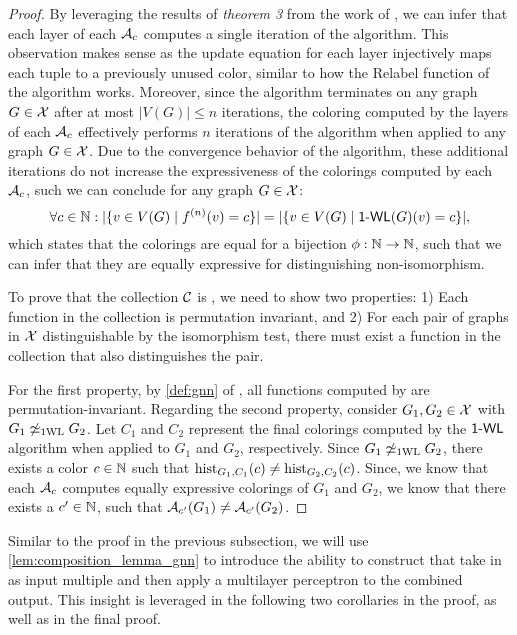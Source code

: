 \begin{proof}
    By leveraging the results of \textit{theorem 3} from the work of \cite{Xu2018}, we can infer that each layer of each $\mathcal{A}_c$ computes a single iteration of the \wl algorithm. This observation makes sense as the update equation for each layer injectively maps each tuple to a previously unused color, similar to how the \textsf{Relabel} function of the \wl algorithm works. Moreover, since the \wl algorithm terminates on any graph $G \in \mathcal{X}$ after at most $|V(G)| \leq n$ iterations, the coloring computed by the layers of each $\mathcal{A}_c$ effectively performs $n$ iterations of the \wl algorithm when applied to any graph $G \in \mathcal{X}$. Due to the convergence behavior of the \wl algorithm, these additional iterations do not increase the expressiveness of the colorings computed by each $\mathcal{A}_c$, such we can conclude for any graph $G \in \mathcal{X}$:
    \begin{equation*}
       \forall c \in \mathbb{N}: |\{ v \in V(G) \mid  f^{(n)}(v) = c \}| = |\{ v \in V(G) \mid  \textsf{1-WL}(G)(v) = c \}|,
    \end{equation*}
    which states that the colorings are equal for a bijection $\phi : \mathbb{N} \rightarrow \mathbb{N}$, such that we can infer that they are equally expressive for distinguishing non-isomorphism.

    To prove that the collection $\mathcal{C}$ is \wldisc, we need to show two properties: 1) Each function in the collection is permutation invariant, and 2) For each pair of graphs in $\mathcal{X}$ distinguishable by the \wl isomorphism test, there must exist a function in the collection that also distinguishes the pair.
   
    For the first property, by \cref{def:gnn} of \gnns, all functions computed by \gnns are permutation-invariant.
    Regarding the second property, consider $G_1, G_2 \in \mathcal{X}$ with $G_1 \not\simeq_{\text{1WL}} G_2$. Let $C_1$ and $C_2$ represent the final colorings computed by the $\textsf{1-WL}$ algorithm when applied to $G_1$ and $G_2$, respectively. Since $G_1 \not\simeq_{\text{1WL}} G_2$, there exists a color $c \in \mathbb{N}$ such that $\operatorname{hist}_{G_1,C_1}(c) \neq \operatorname{hist}_{G_2,C_2}(c)$. Since, we know that each $\mathcal{A}_c$ computes equally expressive colorings of $G_1$ and $G_2$, we know that there exists a $c' \in \mathbb{N}$, such that $\mathcal{A}_{c'}(G_1) \neq \mathcal{A}_{c'}(G_2)$.
\end{proof}
 
Similar to the proof in the previous subsection, we will use \cref{lem:composition_lemma_gnn} to introduce the ability to construct \gnns that take in as input multiple \gnns and then apply a multilayer perceptron to the combined output. This insight is leveraged in the following two corollaries in the proof, as well as in the final proof.

